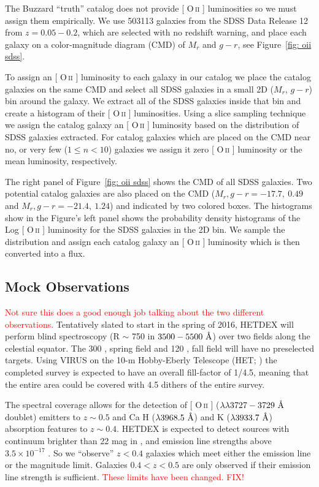 \documentclass[fleqn,usenatbib]{mnras}
\makeatletter
\newcommand{\editorial}[1]{\textcolor{red}{#1}}
\DeclareRobustCommand{\ion}[2]{%
\relax\ifmmode
\ifx\testbx\f@series
{\mathbf{#1\,\mathsc{#2}}}\else
{\mathrm{#1\,\mathsc{#2}}}\fi
\else\textup{#1\,{\mdseries\textsc{#2}}}%
\fi}
\makeatother
\begin{document}
The Buzzard ``truth'' catalog does not provide [\ion{O}{ii}] luminosities so we must assign them empirically. We use 503113 galaxies from the SDSS Data Release 12 \citep{Alam2015} from $z = 0.05 - 0.2$, which are selected with no redshift warning, and place each galaxy on a color-magnitude diagram (CMD) of $M_r$ and $g-r$, see Figure~\ref{fig: oii sdss}.

To assign an [\ion{O}{ii}] luminosity to each galaxy in our catalog we place the catalog galaxies on the same CMD and select all SDSS galaxies in a small 2D ($M_r$, $g-r$) bin around the galaxy. We extract all of the SDSS galaxies inside that bin and create a histogram of their [\ion{O}{ii}] luminosities. Using a slice sampling technique \citep{Neal1997} we assign the catalog galaxy an [\ion{O}{ii}] luminosity based on the distribution of SDSS galaxies extracted. For catalog galaxies which are placed on the CMD near no, or very few ($1\leq n<10$) galaxies we assign it zero [\ion{O}{ii}] luminosity or the mean luminosity, respectively.

The right panel of Figure~\ref{fig: oii sdss} shows the CMD of all SDSS galaxies. Two potential catalog galaxies are also placed on the CMD ($M_r, g-r = -17.7,~0.49$ and $M_r, g-r = -21.4,~1.24$) and indicated by two colored boxes. The histograms show in the Figure's left panel shows the probability density histograms of the Log [\ion{O}{ii}] luminosity for the SDSS galaxies in the 2D bin. We sample the distribution and assign each catalog galaxy an [\ion{O}{ii}] luminosity which is then converted into a flux.

\subsection{Mock Observations}\label{sec: observations}
\editorial{Not sure this does a good enough job talking about the two different observations.}
Tentatively slated to start in the spring of 2016, HETDEX will perform blind spectroscopy (R $\sim$ 750 in $3500 - 5500~\hbox{\AA}$) over two fields along the celestial equator. The 300 \degsq, spring field and 120 \degsq, fall field will have no preselected targets. Using VIRUS on the 10-m Hobby-Eberly Telescope (HET; \citealt{Ramsey1998}) the completed survey is expected to have an overall fill-factor of 1/4.5, meaning that the entire area could be covered with 4.5 dithers of the entire survey. 

The spectral coverage allows for the detection of [\ion{O}{ii}] ($\lambda\lambda 3727-3729~\hbox{\AA}$ doublet) emitters to $z\sim 0.5$ and Ca H ($\lambda 3968.5~\hbox{\AA}$) and K ($\lambda 3933.7~\hbox{\AA}$) absorption features to $z\sim 0.4$. HETDEX is expected to detect sources with continuum brighter than 22 mag in \sdssg, and emission line strengths above $3.5\times10^{-17}$ \ergscm. So we ``observe'' $z<0.4$ galaxies which meet either the emission line or the magnitude limit. Galaxies $0.4<z<0.5$ are only observed if their emission line strength is sufficient. \editorial{These limits have been changed. FIX!}
\end{document}
